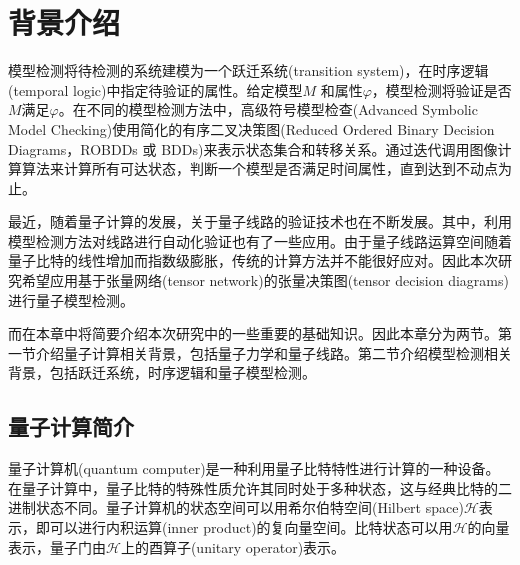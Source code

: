 \chapter{背景介绍}


模型检测将待检测的系统建模为一个跃迁系统(transition system)，在时序逻辑(temporal logic)中指定待验证的属性。给定模型\(M\) 和属性\(\varphi\)，模型检测将验证是否\(M\)满足\(\varphi\)。在不同的模型检测方法中，高级符号模型检查(Advanced Symbolic Model Checking)\citep{Grobelna_2015}使用简化的有序二叉决策图(Reduced Ordered Binary Decision Diagrams，ROBDDs 或 BDDs)\citep{Bryant_1986}来表示状态集合和转移关系。通过迭代调用图像计算算法来计算所有可达状态，判断一个模型是否满足时间属性，直到达到不动点为止。

最近，随着量子计算的发展，关于量子线路的验证技术也在不断发展\citep{viamontes2007checking,burgholzer2020advanced}。其中，利用模型检测方法对线路进行自动化验证也有了一些应用。由于量子线路运算空间随着量子比特的线性增加而指数级膨胀，传统的计算方法并不能很好应对。因此本次研究希望应用基于张量网络(tensor network)的张量决策图(tensor decision diagrams)进行量子模型检测。

而在本章中将简要介绍本次研究中的一些重要的基础知识。因此本章分为两节。第一节介绍量子计算相关背景，包括量子力学和量子线路。第二节介绍模型检测相关背景，包括跃迁系统，时序逻辑和量子模型检测。
\section{量子计算简介}
量子计算机(quantum computer)是一种利用量子比特特性进行计算的一种设备。在量子计算中，量子比特的特殊性质允许其同时处于多种状态，这与经典比特的二进制状态不同。量子计算机的状态空间可以用希尔伯特空间(Hilbert space)\(\mathcal{H}\)表示\citep{nielsen2010quantum}，即可以进行内积运算(inner product)的复向量空间。比特状态可以用\(\mathcal{H}\)的向量表示，量子门由\(\mathcal{H}\)上的酉算子(unitary operator)表示。

